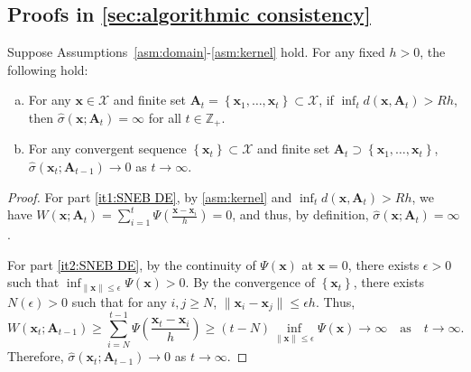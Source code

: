 \documentclass[11pt,en]{elegantpaper}
\newcommand{\domain}{\mathcal{X}}
\newcommand{\x}{\bm{x}}
\newcommand{\A}{\bm{A}}
\newcommand{\1}{\mathds{1}}
\newcommand{\set}[1]{\left\{#1\right\}}
\newcommand{\itref}[1]{\hyperref[#1]{\textcolor{black}{\ref*{#1}}}}
\begin{document}
\subsection{Proofs in \texorpdfstring{\cref{sec:algorithmic consistency}}{Section 4.2}}
\label{sec:proofs of algorithmic consistency}

\begin{lemma}
    \label{lem:SNEB DE}
    Suppose Assumptions~\ref{asm:domain}-\ref{asm:kernel} hold. For any fixed $h > 0$, the following hold:
    \begin{enumerate}[(a)]
        \item\label{it1:SNEB DE} For any $\x \in \domain$ and finite set $\A_t = \set{\x_1, \dots, \x_t} \subset \domain$, if $\inf_{t} d(\x, \A_t) > R h$, then $\widehat{\sigma}(\x; \A_t) = \infty$ for all $t \in \mathbb{Z}_+$.

        \item\label{it2:SNEB DE} For any convergent sequence $\set{\x_t} \subset \domain$ and finite set $\A_t \supset \set{\x_1, \dots, \x_t}$, $\widehat{\sigma}(\x_t; \A_{t-1}) \to 0$ as $t \to \infty$.
    \end{enumerate}
\end{lemma}

\begin{proof}
    For part \itref{it1:SNEB DE}, by \cref{asm:kernel} and $\inf_{t} d(\x, \A_t) > R h$, we have $W(\x; \A_t) = \sum_{i=1}^{t} \Psi\left( \frac{\x - \x_i}{h} \right) = 0$, and thus, by definition, $\widehat{\sigma}(\x; \A_t) = \infty$.
    
    For part \itref{it2:SNEB DE}, by the continuity of $\Psi(\x)$ at $\x = 0$, there exists $\epsilon > 0$ such that $\inf_{\| \x \| \le \epsilon} \Psi(\x) > 0$. By the convergence of $\set{\x_t}$, there exists $N(\epsilon) > 0$ such that for any $i, j \ge N$, $\| \x_i - \x_j \| \le \epsilon h$. Thus,
    \[
        W(\x_t; \A_{t-1}) \ge \sum_{i=N}^{t-1} \Psi\left(\frac{\x_t - \x_i}{h}\right) \ge (t - N) \inf_{\| \x \| \le \epsilon} \Psi(\x) \to \infty \quad \text{as} \quad t \to \infty.
    \]
    Therefore, $\widehat{\sigma}(\x_t; \A_{t-1}) \to 0$ as $t \to \infty$.
\end{proof}
\end{document}
